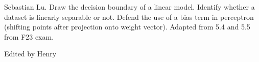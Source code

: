 \begin{parts}
\begin{subparts}
\begin{comment}
            \subpart[2] \textbf{Short answer:} The 10-301 TA team has wants to utilize a fully-converged iteration of this classifier to identify different clones. With the given information, is it guarenteed for the model to converge? Justify your answer.
            \fillwithlines{2em}
            \begin{soln}
                No. If the data is not linearly separable, then it may not be possible to to converge. 
            \end{soln}
        
            \subpart[1] \textbf{Drawing: } Assume that the perceptron algorithm does converge. On the graph below, approximately draw the relationship between total number of mistakes vs. number training examples.
            \begin{center}
            \begin{tikzpicture}
            \begin{axis}[
                scale=1.5, axis equal image, mark options={scale=1.5},
                xmin=0, xmax=6, xtick={1,...,5},
                ymin=0, ymax=6, ytick={1,...,5},
                samples=50, grid=major, xlabel=Examples, ylabel=Total Mistakes]]
                \begin{soln}
                   \addplot[latex-latex,smooth,black,mark=none,%
                    line width=1.5pt,domain=-3.5:9.5,
                    samples=63,
                    color=red]  {ln(x)+2};
                \end{soln}
            \end{axis}
            \end{tikzpicture} 
            \end{center}
        
            \begin{qtester}
                Solution needed. This question seems a little tricky to me. 
            \end{qtester}
        \end{comment}   
    \end{subparts}
    \begin{qauthor}
        Sebastian Lu. Draw the decision boundary of a linear model.
        Identify whether a dataset is linearly separable or not. 
        Defend the use of a bias term in perceptron (shifting points after projection onto weight vector). Adapted from 5.4 and 5.5 from F23 exam.
        
        Edited by Henry
    \end{qauthor}


\end{parts}
